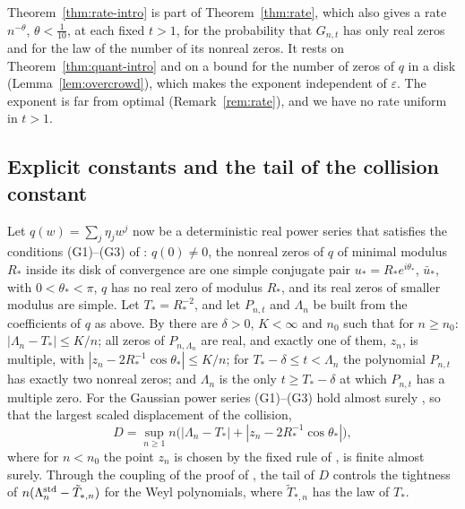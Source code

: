 \documentclass[11pt]{amsart}
\theoremstyle{definition}
\theoremstyle{remark}
\numberwithin{equation}{section}
\newcommand{\eps}{\varepsilon}
\begin{document}
Theorem~\ref{thm:rate-intro} is part of Theorem~\ref{thm:rate}, which also gives a rate $n^{-\theta}$, $\theta<\frac1{10}$, at each fixed $t>1$, for the probability that $G_{n,t}$ has only real zeros and for the law of the number of its nonreal zeros. It rests on Theorem~\ref{thm:quant-intro} and on a bound for the number of zeros of $q$ in a disk (Lemma~\ref{lem:overcrowd}), which makes the exponent independent of $\eps$. The exponent is far from optimal (Remark~\ref{rem:rate}), and we have no rate uniform in $t>1$.

\subsection{Explicit constants and the tail of the collision constant}
Let $q(w)=\sum_j\eta_jw^j$ now be a deterministic real power series that satisfies the conditions (G1)--(G3) of \cite[Section~\ref{M-sec:collision}]{Main}: $q(0)\ne0$, the nonreal zeros of $q$ of minimal modulus $R_*$ inside its disk of convergence are one simple conjugate pair $u_*=R_*e^{i\theta_*}$, $\bar u_*$, with $0<\theta_*<\pi$, $q$ has no real zero of modulus $R_*$, and its real zeros of smaller modulus are simple. Let $T_*=R_*^{-2}$, and let $P_{n,t}$ and $\Lambda_n$ be built from the coefficients of $q$ as above. By \cite[Theorem~\ref{M-thm:collision}]{Main} there are $\delta>0$, $K<\infty$ and $n_0$ such that for $n\ge n_0$: $|\Lambda_n-T_*|\le K/n$; all zeros of $P_{n,\Lambda_n}$ are real, and exactly one of them, $z_n$, is multiple, with $|z_n-2R_*^{-1}\cos\theta_*|\le K/n$; for $T_*-\delta\le t<\Lambda_n$ the polynomial $P_{n,t}$ has exactly two nonreal zeros; and $\Lambda_n$ is the only $t\ge T_*-\delta$ at which $P_{n,t}$ has a multiple zero. For the Gaussian power series (G1)--(G3) hold almost surely \cite[Corollary~\ref{M-cor:collision-gauss}]{Main}, so that the largest scaled displacement of the collision,
\[
D=\sup_{n\ge1}n\bigl(|\Lambda_n-T_*|+|z_n-2R_*^{-1}\cos\theta_*|\bigr),
\]
where for $n<n_0$ the point $z_n$ is chosen by the fixed rule of \cite[Section~\ref{M-subsec:collision-generic}]{Main}, is finite almost surely. Through the coupling of the proof of \cite[Corollary~\ref{M-cor:collision-weyl}]{Main}, the tail of $D$ controls the tightness of $n(\Lambda_n^{\rm std}-\tilde T_{*,n})$ for the Weyl polynomials, where $\tilde T_{*,n}$ has the law of $T_*$.
\end{document}
